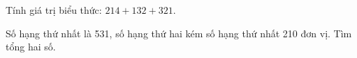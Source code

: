 \begin{ex} %
Tính giá trị biểu thức: $214 + 132 + 321$.
\end{ex}

\begin{ex} %
Số hạng thứ nhất là 531, số hạng thứ hai kém số hạng thứ nhất 210 đơn vị. Tìm tổng hai số.
\end{ex}
